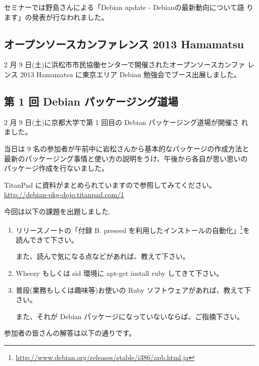 \documentclass[mingoth,a4paper]{jsarticle}
\begin{document}
セミナーでは野島さんによる「Debian update - Debianの最新動向について語
ります」の発表が行なわれました。

\subsection{オープンソースカンファレンス 2013 Hamamatsu}
2 月 9 日(土)に浜松市市民協働センターで開催されたオープンソースカンファ
レンス 2013 Hamamatsu に東京エリア  Debian 勉強会でブース出展しました。

\subsection{第 1 回 Debian パッケージング道場}
2 月 9 日(土)に京都大学で第 1 回目の Debian パッケージング道場が開催さ
れました。

当日は 9 名の参加者が午前中に岩松さんから基本的なパッケージの作成方法と
最新のパッケージング事情と使い方の説明をうけ、午後から各自が思い思いの
パッケージ作成を行ないました。

TitanPad に資料がまとめられていますので参照してみてください。
\url{http://debian-pkg-dojo.titanpad.com/1}


今回は以下の課題を出題しました.
\begin{screen}
  \begin{enumerate}
  \item リリースノートの「付録 B. preseed を利用したインストールの自動化」\footnote{\url{http://www.debian.org/releases/stable/i386/apb.html.ja}}を読んできて下さい。

    また、読んで気になる点などがあれば、教えて下さい。
  \item Wheezy もしくは sid 環境に apt-get install ruby してきて下さい。
  \item 普段(業務もしくは趣味等)お使いの Ruby ソフトウェアがあれば、教えて下さい。

    また、それが Debian パッケージになっていないならば、ご指摘下さい。
  \end{enumerate}
\end{screen}

参加者の皆さんの解答は以下の通りです。
\end{document}
